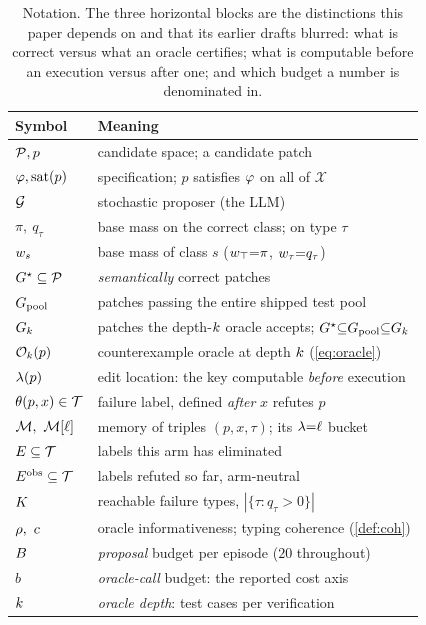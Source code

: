 \begin{table}[t]
\centering
\footnotesize
\caption{Notation. The three horizontal blocks are the distinctions this paper
depends on and that its earlier drafts blurred: what is correct versus what an
oracle certifies; what is computable before an execution versus after one; and
which budget a number is denominated in.}
\label{tab:notation}
\setlength{\tabcolsep}{4pt}
\begin{tabular}{@{}ll@{}}
\toprule
\textbf{Symbol} & \textbf{Meaning} \\
\midrule
$\mathcal{P}, p$ & candidate space; a candidate patch \\
$\varphi, \mathrm{sat}(p)$ & specification; $p$ satisfies $\varphi$ on all of $\mathcal{X}$ \\
$\mathcal{G}$ & stochastic proposer (the LLM) \\
$\pi,\ q_\tau$ & base mass on the correct class; on type $\tau$ \\
$w_s$ & base mass of class $s$ ($w_\top{=}\pi$, $w_\tau{=}q_\tau$) \\
\midrule
$G^{\star} \subseteq \mathcal{P}$ & \emph{semantically} correct patches \\
$G_{\mathrm{pool}}$ & patches passing the entire shipped test pool \\
$G_{k}$ & patches the depth-$k$ oracle accepts;
  $G^{\star} {\subseteq} G_{\mathrm{pool}} {\subseteq} G_{k}$ \\
$\mathcal{O}_{k}(p)$ & counterexample oracle at depth $k$ (\cref{eq:oracle}) \\
\midrule
$\lambda(p)$ & edit location: the key computable \emph{before} execution \\
$\theta(p, x) \in \mathcal{T}$ & failure label, defined \emph{after} $x$ refutes $p$ \\
$\mem,\ \mem[\ell]$ & memory of triples $(p, x, \tau)$; its $\lambda{=}\ell$ bucket \\
$E \subseteq \mathcal{T}$ & labels this arm has eliminated \\
$E^{\mathrm{obs}} \subseteq \mathcal{T}$ & labels refuted so far, arm-neutral \\
$K$ & reachable failure types, $|\{\tau : q_\tau > 0\}|$ \\
$\info,\ \coh$ & oracle informativeness; typing coherence (\cref{def:coh}) \\
\midrule
$B$ & \emph{proposal} budget per episode ($20$ throughout) \\
$b$ & \emph{oracle-call} budget: the reported cost axis \\
$k$ & \emph{oracle depth}: test cases per verification \\
\bottomrule
\end{tabular}
\end{table}
